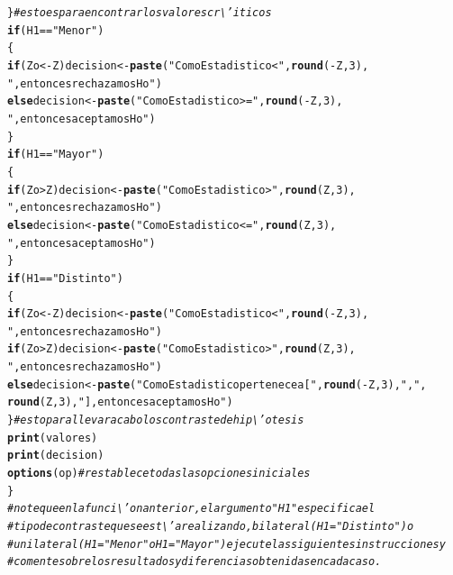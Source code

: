 \documentclass[12pt,letterpaper]{article}\usepackage[]{graphicx}\usepackage[]{color}
\makeatletter
\newcommand{\hlnum}[1]{\textcolor[rgb]{0.686,0.059,0.569}{#1}}%
\newcommand{\hlstr}[1]{\textcolor[rgb]{0.192,0.494,0.8}{#1}}%
\newcommand{\hlcom}[1]{\textcolor[rgb]{0.678,0.584,0.686}{\textit{#1}}}%
\newcommand{\hlopt}[1]{\textcolor[rgb]{0,0,0}{#1}}%
\newcommand{\hlstd}[1]{\textcolor[rgb]{0.345,0.345,0.345}{#1}}%
\newcommand{\hlkwa}[1]{\textcolor[rgb]{0.161,0.373,0.58}{\textbf{#1}}}%
\newcommand{\hlkwb}[1]{\textcolor[rgb]{0.69,0.353,0.396}{#1}}%
\newcommand{\hlkwd}[1]{\textcolor[rgb]{0.737,0.353,0.396}{\textbf{#1}}}%
\newenvironment{kframe}{%
 \def\at@end@of@kframe{}%
 \ifinner\ifhmode%
  \def\at@end@of@kframe{\end{minipage}}%
  \begin{minipage}{\columnwidth}%
 \fi\fi%
 \def\FrameCommand##1{\hskip\@totalleftmargin \hskip-\fboxsep
 \colorbox{shadecolor}{##1}\hskip-\fboxsep
     \hskip-\linewidth \hskip-\@totalleftmargin \hskip\columnwidth}%
 \MakeFramed {\advance\hsize-\width
   \@totalleftmargin\z@ \linewidth\hsize
   \@setminipage}}%
 {\par\unskip\endMakeFramed%
 \at@end@of@kframe}
\newenvironment{knitrout}{}{} %
\makeatother
\begin{document}
\begin{knitrout}
\begin{kframe}
\begin{alltt}
\hlstd{\}} \hlcom{# esto es para encontrar los valores cr\textbackslash{}'iticos }
\hlkwa{if} \hlstd{(H1} \hlopt{==} \hlstr{"Menor"}\hlstd{)}
\hlstd{\{}
 \hlkwa{if} \hlstd{(Zo} \hlopt{< -}\hlstd{Z) decision} \hlkwb{<-} \hlkwd{paste}\hlstd{(}\hlstr{"Como Estadistico <"}\hlstd{,} \hlkwd{round}\hlstd{(}\hlopt{-}\hlstd{Z,}\hlnum{3}\hlstd{),}
                                \hlstr{", entonces rechazamos Ho"}\hlstd{)}
 \hlkwa{else} \hlstd{decision} \hlkwb{<-} \hlkwd{paste}\hlstd{(}\hlstr{"Como Estadistico>="}\hlstd{,} \hlkwd{round}\hlstd{(}\hlopt{-}\hlstd{Z,}\hlnum{3}\hlstd{),}
                        \hlstr{", entonces aceptamos Ho"}\hlstd{)}
\hlstd{\}}
\hlkwa{if} \hlstd{(H1} \hlopt{==} \hlstr{"Mayor"}\hlstd{)}
\hlstd{\{}
\hlkwa{if} \hlstd{(Zo} \hlopt{>} \hlstd{Z) decision} \hlkwb{<-} \hlkwd{paste}\hlstd{(}\hlstr{"Como Estadistico >"}\hlstd{,} \hlkwd{round}\hlstd{(Z,}\hlnum{3}\hlstd{),}
                              \hlstr{", entonces rechazamos Ho"}\hlstd{)}
\hlkwa{else} \hlstd{decision} \hlkwb{<-} \hlkwd{paste}\hlstd{(}\hlstr{"Como Estadistico <="}\hlstd{,} \hlkwd{round}\hlstd{(Z,}\hlnum{3}\hlstd{),}
                       \hlstr{", entonces aceptamos Ho"}\hlstd{)}
\hlstd{\}}
\hlkwa{if} \hlstd{(H1} \hlopt{==} \hlstr{"Distinto"}\hlstd{)}
\hlstd{\{}
 \hlkwa{if} \hlstd{(Zo} \hlopt{< -}\hlstd{Z) decision} \hlkwb{<-} \hlkwd{paste}\hlstd{(}\hlstr{"Como Estadistico <"}\hlstd{,} \hlkwd{round}\hlstd{(}\hlopt{-}\hlstd{Z,}\hlnum{3}\hlstd{),}
                                \hlstr{", entonces rechazamos Ho"}\hlstd{)}
 \hlkwa{if} \hlstd{(Zo} \hlopt{>} \hlstd{Z) decision} \hlkwb{<-} \hlkwd{paste}\hlstd{(}\hlstr{"Como Estadistico >"}\hlstd{,} \hlkwd{round}\hlstd{(Z,}\hlnum{3}\hlstd{),}
                               \hlstr{", entonces rechazamos Ho"}\hlstd{)}
 \hlkwa{else} \hlstd{decision} \hlkwb{<-} \hlkwd{paste}\hlstd{(}\hlstr{"Como Estadistico pertenece a ["}\hlstd{,} \hlkwd{round}\hlstd{(}\hlopt{-}\hlstd{Z,}\hlnum{3}\hlstd{),} \hlstr{","}\hlstd{,}
\hlkwd{round}\hlstd{(Z,}\hlnum{3}\hlstd{),} \hlstr{"], entonces aceptamos Ho"}\hlstd{)}
\hlstd{\}} \hlcom{# esto para llevar a cabo los contraste de hip\textbackslash{}'otesis }
\hlkwd{print}\hlstd{(valores)}
\hlkwd{print}\hlstd{(decision)}
\hlkwd{options}\hlstd{(op)} \hlcom{# restablece todas las opciones iniciales }
\hlstd{\}}
\hlcom{# note que en la funci\textbackslash{}'on anterior, el argumento "H1" especifica el }
\hlcom{# tipo de contraste que se est\textbackslash{}'a realizando, bilateral (H1= "Distinto") o }
\hlcom{# unilateral (H1= "Menor" o H1= "Mayor") ejecute las siguientes instrucciones y }
\hlcom{# comente sobre los resultados y diferencias obtenidas en cada caso. }

\end{alltt}
\end{kframe}
\end{knitrout}
\end{document}
